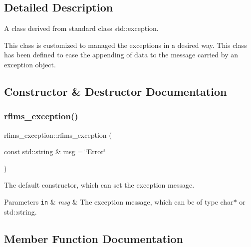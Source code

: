 \subsection{Detailed Description}
A class derived from standard class {\ttfamily std\+::exception}. 

This class is customized to managed the exceptions in a desired way. This class has been defined to ease the appending of data to the message carried by an exception object. 

\subsection{Constructor \& Destructor Documentation}
\mbox{\label{classrfims__exception_aed3788a57bce5b92083bf52994c588bb}} 
\subsubsection{\texorpdfstring{rfims\+\_\+exception()}{rfims\_exception()}}
{\footnotesize\ttfamily rfims\+\_\+exception\+::rfims\+\_\+exception (\begin{DoxyParamCaption}\item[{const std\+::string \&}]{msg = {\ttfamily \char`\"{}Error\char`\"{}} }\end{DoxyParamCaption})\hspace{0.3cm}{\ttfamily [inline]}}



The default constructor, which can set the exception message. 


\begin{DoxyParams}[1]{Parameters}
\mbox{\tt in}  & {\em msg} & The exception message, which can be of type {\ttfamily char$\ast$} or {\ttfamily std\+::string}. \\
\hline
\end{DoxyParams}


\subsection{Member Function Documentation}
\mbox{\label{classrfims__exception_a5a90261ca9eba0f0b365e4f61fa60df2}} 
